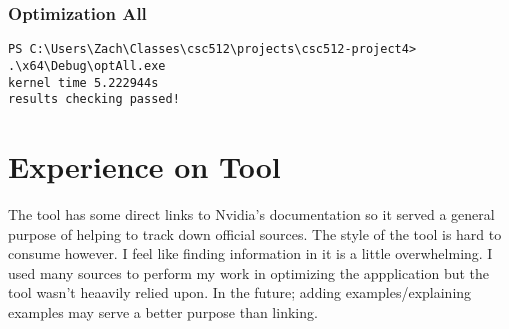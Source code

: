 \documentclass{article}
\begin{document}
  \subsubsection{Optimization All}
  \begin{lstlisting}[breaklines=true,basicstyle=\footnotesize]
PS C:\Users\Zach\Classes\csc512\projects\csc512-project4> .\x64\Debug\optAll.exe
kernel time 5.222944s
results checking passed!
  \end{lstlisting}

\section{Experience on Tool}
The tool has some direct links to Nvidia's documentation so it served a general
purpose of helping to track down official sources. The style of the tool is hard
to consume however. I feel like finding information in it is a little
overwhelming. I used many sources to perform my work in optimizing the
appplication but the tool wasn't heaavily relied upon. In the future; adding
examples/explaining examples may serve a better purpose than linking.
\end{document}
